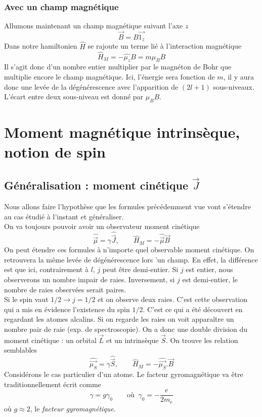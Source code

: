 		\subsubsection{Avec un champ magnétique}
		Allumons maintenant un champ magnétique suivant l'axe $z$ 
		\begin{equation}
		\vec{B}=B\vec{1_z}
		\end{equation}
		Dans notre hamiltonien $\hat H$ se rajoute un terme lié à l'interaction magnétique
		\begin{equation}
		\hat{H}_M = -\hat{\mu_z}B = m\mu_BB
		\end{equation}
		Il s'agit donc d'un nombre entier multiplier par le magnéton de Bohr que multiplie 
		encore le champ magnétique. Ici, l'énergie sera fonction de $m$, il y aura donc une 
		levée de la dégénérescence avec l'apparition de $(2l+1)$ sous-niveaux. L'écart entre 
		deux sous-niveau est donné par $\mu_BB$.
		
	
\section{Moment magnétique intrinsèque, notion de spin}
	\subsection{Généralisation : moment cinétique $\vec{J}$}
	Nous allons faire l'hypothèse que les formules précédemment vue vont s'étendre au cas 
	étudié à l'instant et généraliser. \\
	On va toujours pouvoir avoir un observateur moment cinétique
	\begin{equation}
	\hat{\vec{\mu}} = \gamma\hat{\vec{J}},\qquad \hat{H}_M = -\hat{\vec{\mu}}\vec{B}
	\end{equation}
	On peut étendre ces formules à n'importe quel observable moment cinétique. On 
	retrouvera la même levée de dégénérescence lors 'un champ. En effet,
	la différence est que ici, contrairement à $l$, $j$ peut être demi-entier. Si 
	$j$ est entier, nous observerons un nombre impair de raies. Inversement, si $j$ 
	est demi-entier, le nombre de raies observées serait paires.\\
	
	Si le spin vaut $1/2\rightarrow j = 1/2$ et on observe deux raies. C'est cette 
	observation qui a mis en évidence l'existence du spin $1/2$.	
	C'est ce qui a été découvert en regardant les atomes alcalins.  Si on regarde 
	les raies on voit apparaître un nombre pair de raie (exp. de spectroscopie). 
	On a donc une double division du moment cinétique : un orbital $\vec{L}$ et un 
	intrinsèque $\vec{S}$. On trouve les relation semblables
	\begin{equation}
	\hat{\vec{\mu_S}} = \gamma\hat{\vec{S}},\qquad \hat{H}_M = -\hat{\vec{\mu_S}}.\vec{B}
	\end{equation}
	Considérons le cas particulier d'un atome. Le facteur gyromagnétique va être 
	traditionnellement 	écrit comme
	\begin{equation}
	\gamma = g\gamma_0\qquad \text{où }\ \gamma_0 = -\frac{e}{2m_e}
	\end{equation}
	où $g\approx 2$, le \textit{facteur gyromagnétique}.
	
